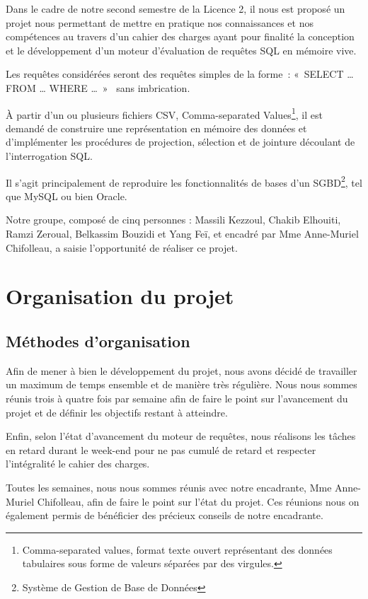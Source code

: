 \documentclass[oneside,13pt,a4paper]{report}
\begin{document}
        Dans le cadre de notre second semestre de la Licence 2, 
        il nous est proposé un projet nous permettant de mettre en pratique nos connaissances et nos compétences 
        au travers d’un cahier des charges ayant pour finalité la conception et le développement d’un moteur d’évaluation de requêtes SQL en mémoire vive.

        Les requêtes considérées seront des requêtes simples de la forme : « SELECT … FROM … WHERE … »  sans imbrication.

        À partir d’un ou plusieurs fichiers CSV, Comma-separated Values\footnote{Comma-separated values, format texte ouvert représentant des données tabulaires sous forme de valeurs séparées par des virgules.}, 
        il est demandé de construire une représentation en mémoire des données et d’implémenter les procédures de projection, 
        sélection et de jointure découlant de l’interrogation SQL.

        Il s’agit principalement de reproduire les fonctionnalités de bases d’un SGBD\footnote{Système de Gestion de Base de Données}, tel que MySQL ou bien Oracle.

        Notre groupe, composé de cinq personnes : Massili Kezzoul, Chakib Elhouiti, Ramzi Zeroual, Belkassim Bouzidi et Yang Feï, et encadré par Mme Anne-Muriel Chifolleau,
        a saisie l'opportunité de réaliser ce projet.

    \chapter{Organisation du projet}
        \section{Méthodes d’organisation}

            Afin de mener à bien le développement du projet, nous avons décidé de travailler un maximum de temps ensemble et de manière très régulière. Nous nous sommes réunis trois à quatre fois par semaine afin de faire le point sur l’avancement du projet et de définir les objectifs restant à atteindre.

            Enfin, selon l’état d’avancement du moteur de requêtes, nous réalisons les tâches en retard durant le week-end pour ne pas cumulé de retard et respecter l’intégralité le cahier des charges.

            Toutes les semaines, nous nous sommes réunis avec notre encadrante, Mme Anne-Muriel Chifolleau, afin de faire le point sur l’état du projet. Ces réunions nous on également permis de bénéficier des précieux conseils de notre encadrante.
\end{document}
